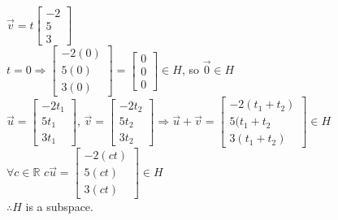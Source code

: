 \documentclass[a4paper]{article}
\begin{document}
$\vec{v} = t\begin{bmatrix}
-2\\
5\\
3
\end{bmatrix}$\\
$t = 0 \Rightarrow \begin{bmatrix}
-2(0)\\
5(0)\\
3(0)
\end{bmatrix} = \begin{bmatrix}
0\\
0\\
0
\end{bmatrix} \in H$, so $\vec{0} \in H$\\
$\vec{u} = \begin{bmatrix}
-2t_1\\
5t_1\\
3t_1
\end{bmatrix}$, $\vec{v} = \begin{bmatrix}
-2t_2\\
5t_2\\
3t_2
\end{bmatrix} \Rightarrow \vec{u} + \vec{v} = \begin{bmatrix}
-2(t_1+t_2)\\
5(t_1+t_2\\
3(t_1+t_2)
\end{bmatrix} \in H$\\
$\forall c \in \mathbb{R}$ $c \vec{u} = \begin{bmatrix}
-2(ct)\\
5(ct)\\
3(ct)
\end{bmatrix} \in H$\\
$\therefore H$ is a subspace.\\
\end{document}
